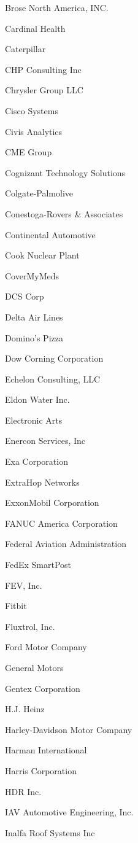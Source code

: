 \documentclass[twoside]{article}
\begin{document}
\begin{center}
\begin{multicols}{5}
\begin{FlushLeft}
\begin{compactitem}
\item Brose North America, INC.
\item Cardinal Health
\item Caterpillar
\item CHP Consulting Inc
\item Chrysler Group LLC
\item Cisco Systems
\item Civis Analytics
\item CME Group
\item Cognizant Technology Solutions
\item Colgate-Palmolive
\item Conestoga-Rovers \& Associates
\item Continental Automotive
\item Cook Nuclear Plant
\item CoverMyMeds
\item DCS Corp
\item Delta Air Lines
\item Domino's Pizza
\item Dow Corning Corporation
\item Echelon Consulting, LLC
\item Eldon Water Inc.
\item Electronic Arts
\item Enercon Services, Inc
\item Exa Corporation
\item ExtraHop Networks
\item ExxonMobil Corporation
\item FANUC America Corporation
\item Federal Aviation Administration
\item FedEx SmartPost
\item FEV, Inc.
\item Fitbit
\item Fluxtrol, Inc.
\item Ford Motor Company
\item General Motors
\item Gentex Corporation
\item H.J. Heinz
\item Harley-Davidson Motor Company
\item Harman International
\item Harris Corporation
\item HDR Inc.
\item IAV Automotive Engineering, Inc.
\item Inalfa Roof Systems Inc

\end{compactitem}
\end{FlushLeft}
\end{multicols}
\end{center}
\end{document}

